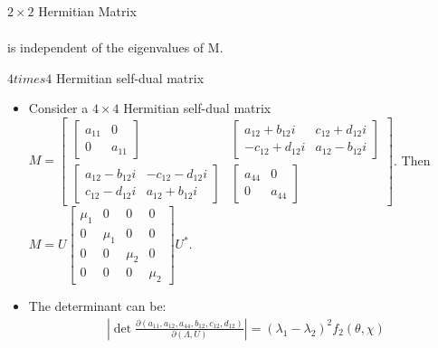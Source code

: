 \documentclass[UTF8,AutoFakeBold,AutoFakeSlant]{beamer}
\begin{document}
\begin{frame}{$2\times 2$ Hermitian Matrix}
\begin{itemize}
\begin{align*}
              \end{align*}
              is independent of the eigenvalues of M.
    \end{itemize}
\end{frame}

\begin{frame}{$4 times 4$ Hermitian self-dual matrix}
    \begin{itemize}
        \tiny
        \item Consider a $4\times 4$ Hermitian self-dual matrix
              $M=\begin{bmatrix}
                      \begin{bmatrix}a_{11}&0\\0&a_{11}\end{bmatrix}                                            & \begin{bmatrix}a_{12}+b_{12}i&c_{12}+d_{12}i\\-c_{12}+d_{12}i&a_{12}-b_{12}i\end{bmatrix} \\
                      \begin{bmatrix}a_{12}-b_{12}i&-c_{12}-d_{12}i\\c_{12}-d_{12}i&a_{12}+b_{12}i\end{bmatrix} & \begin{bmatrix}a_{44}&0\\0&a_{44}\end{bmatrix}
                  \end{bmatrix}$. Then $M=U\begin{bmatrix}\mu_1&0&0&0\\0&\mu_1&0&0\\0&0&\mu_2&0\\0&0&0&\mu_2\end{bmatrix}U^*$.
        \item The determinant can be:
              \begin{align*}
                  \left|\det\frac{\partial(a_{11},a_{12},a_{44},b_{12},c_{12},d_{12})}{\partial(\Lambda, U)}\right|=\left(\lambda_1-\lambda_2\right)^2f_2(\theta, \chi)
              \end{align*}
    \end{itemize}
\end{frame}
\end{document}
